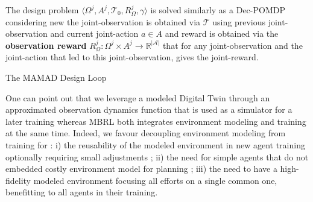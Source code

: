 \documentclass[pdflatex,sn-mathphys-num]{sn-jnl}%
\theoremstyle{thmstyleone}%
\theoremstyle{thmstyletwo}%
\theoremstyle{thmstylethree}%
\begin{document}
The design problem $\langle \Omega^j, A^j, \mathcal{T}_0, R_{\Omega}^j, \gamma \rangle$ is solved similarly as a Dec-POMDP considering new the joint-observation is obtained via $\mathcal{T}$ using previous joint-observation and current joint-action $a \in A$ and reward is obtained via the \textbf{observation reward} $R^j_{\Omega}: \Omega^j \times A^j \rightarrow \mathbb{R}^{|\mathcal{A}|}$ that for any joint-observation and the joint-action that led to this joint-observation, gives the joint-reward.

\vspace{1em}

\begin{algorithm}[H]
    \caption{The MAMAD Design Loop}
    \label{alg:mamad-loop}
    \DontPrintSemicolon
\end{algorithm}

One can point out that we leverage a modeled Digital Twin through an approximated observation dynamics function that is used as a simulator for a later training whereas MBRL both integrates environment modeling and training at the same time. Indeed, we favour decoupling environment modeling from training for : i) the reusability of the modeled environment in new agent training optionally requiring small adjustments ; \quad ii) the need for simple agents that do not embedded costly environment model for planning ; \quad iii) the need to have a high-fidelity modeled environment focusing all efforts on a single common one, benefitting to all agents in their training.
\end{document}
